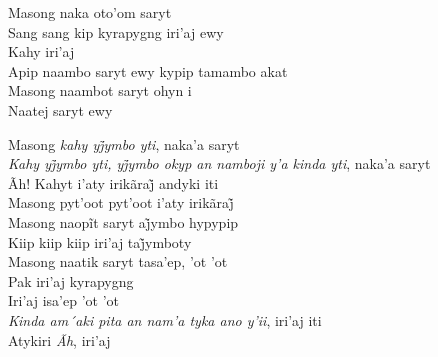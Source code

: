 \bigskip

\begin{linenumbers}
\noindent Masong naka oto'om saryt\\
Sang sang kip kyrapygng iri'aj ewy\\
Kahy iri'aj\\
Apip naambo saryt ewy kypip tamambo akat\\
Masong naambot saryt ohyn i\\
Naatej saryt ewy

\end{linenumbers}

\bigskip

\begin{linenumbers}
\noindent Masong \textit{kahy yj̃ymbo yti}, naka’a saryt\\
\textit{Kahy yj̃ymbo yti, yj̃ymbo okyp an namboji y’a kinda yti}, naka’a saryt\\
Ãh! Kahyt i’aty irikãraj̃ andyki iti\\
Masong pyt’oot pyt’oot i’aty irikãraj̃\\
Masong naopĩt saryt aj̃ymbo hypypip\\
Kiip kiip kiip iri’aj taj̃ymboty\\
Masong naatik saryt tasa'ep, 'ot 'ot\\
Pak iri'aj kyrapygng\\
Iri'aj isa'ep 'ot 'ot\\
\textit{Kinda am´aki pita an nam'a tyka ano y'ii}, iri'aj iti\\
Atykiri \textit{Ãh}, iri'aj

\end{linenumbers}

